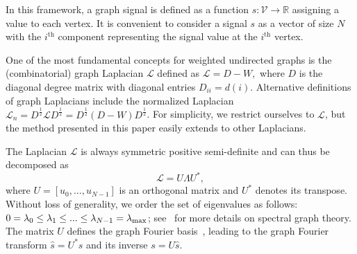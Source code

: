 \documentclass{article}
\newcommand{\Lap}{\mathcal{L}}
\newcommand{\V}{\mathcal{V}}
\newcommand{\x}{u}
\begin{document}
In this framework, a graph signal is defined as a function $s: \V \rightarrow  \mathbb{R}$ assigning a value to each vertex. It is convenient to consider a signal $s$ as a vector of size $N$ with the $i^{\mathrm{th}}$ component representing the signal value at the $i^{\mathrm{th}}$ vertex. 

One of the most fundamental concepts for weighted undirected graphs is the (combinatorial) graph Laplacian $\Lap$ 
defined as
$\Lap = D-W,$ where $D$ is the diagonal degree matrix with diagonal entries $D_{ii}=d(i)$.
Alternative definitions of graph Laplacians include the normalized Laplacian $\Lap_n = D^{\frac{1}{2}} \Lap D^{\frac{1}{2}} = D^{\frac{1}{2}} (D-W) D^{\frac{1}{2}}$.
For simplicity, we restrict ourselves to $\Lap$, but the method presented in this paper easily extends to other Laplacians. 


The Laplacian $\Lap$ is always symmetric positive semi-definite and can thus be decomposed as 
$$\Lap = U\Lambda U^*,$$
where $U = [\x_0, \ldots, \x_{N-1}]$ is an orthogonal matrix and $U^*$ denotes its transpose.
Without loss of generality, we order the set of eigenvalues as follows: $0=\lambda_0 \leq \lambda_1 \leq ... \leq \lambda_{N-1} = \lambda_{\rm max}$;
see~\cite{chung1997spectral} for more details on spectral graph theory. 
The matrix $U$ defines the graph Fourier basis~\cite{shuman2013emerging,shuman2013vertex}, leading to the graph Fourier transform $\hat{s} = U^*s$ and its inverse $s = U\hat{s}$.

\end{document}
